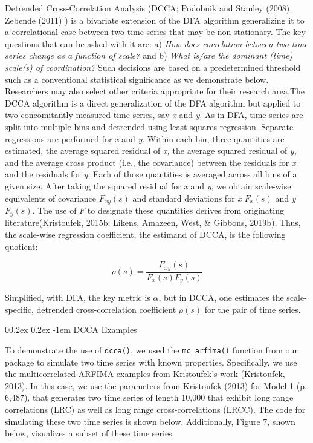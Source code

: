 \documentclass[
  man]{apa6}
\makeatletter
\let\oldparagraph\paragraph
\renewcommand{\paragraph}[1]{\oldparagraph{#1}\mbox{}}
\renewcommand{\paragraph}{\@startsection{paragraph}{4}{\parindent}%
  {0\baselineskip \@plus 0.2ex \@minus 0.2ex}%
  {-1em}%
  {\normalfont\normalsize\bfseries\itshape\typesectitle}}
\makeatother
\begin{document}
Detrended Cross-Correlation Analysis (DCCA;
Podobnik and Stanley (2008),
Zebende (2011) ) is a bivariate extension
of the DFA algorithm generalizing it to a correlational case between two
time series that may be non-stationary. The key questions that can be
asked with it are: a) \emph{How does correlation between two time series
change as a function of scale?} and b) \emph{What is/are the dominant (time)
scale(s) of coordination?} Such decisions are based on a predetermined
threshold such as a conventional statistical significance as we
demonstrate below. Researchers may also select other criteria
appropriate for their research area.The DCCA algorithm is a direct
generalization of the DFA algorithm but applied to two concomitantly
measured time series, say \emph{x} and \emph{y}. As in DFA, time series are split
into multiple bins and detrended using least squares regression.
Separate regressions are performed for \emph{x} and \emph{y}. Within each bin,
three quantities are estimated, the average squared residual of \emph{x,} the
average squared residual of \emph{y}, and the average cross product (i.e.,
the covariance) between the residuals for \emph{x} and the residuals for \emph{y}.
Each of those quantities is averaged across all bins of a given size.
After taking the squared residual for \emph{x} and \emph{y}, we obtain scale-wise
equivalents of covariance \(F_{xy}(s)\) and standard deviations for \emph{x}
\(F_x(s)\) and \emph{y} \(F_y(s)\). The use of \(F\) to designate these quantities
derives from originating literature(Kristoufek, 2015b; Likens, Amazeen, West, \& Gibbons, 2019b). Thus,
the scale-wise regression coefficient, the estimand of DCCA, is the
following quotient:

\[\rho(s)=\frac{F_{xy}(s)}{F_x(s)F_y(s)}\]

Simplified, with DFA, the key metric is \(\alpha\), but in DCCA, one
estimates the scale-specific, detrended cross-correlation coefficient
\(\rho(s)\) for the pair of time series.

\hypertarget{dcca-examples}{%
\paragraph{DCCA Examples}\label{dcca-examples}}

To demonstrate the use of \texttt{dcca()}, we used the \texttt{mc\_arfima()} function
from our package to simulate two time series with known properties.
Specifically, we use the multicorrelated ARFIMA examples from
Kristoufek's work (Kristoufek, 2013). In
this case, we use the parameters from Kristoufek (2013) for Model 1 (p.
6,487), that generates two time series of length 10,000 that exhibit
long range correlations (LRC) as well as long range cross-correlations
(LRCC). The code for simulating these two time series is shown below.
Additionally, Figure 7, shown below, visualizes a subset of these time
series.
\end{document}

